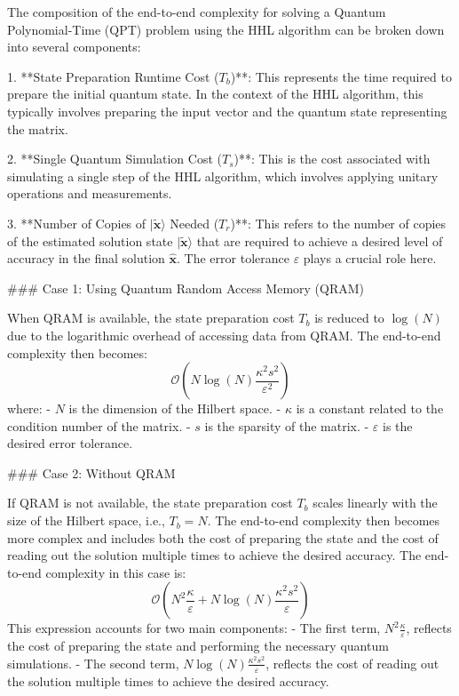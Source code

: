 The composition of the end-to-end complexity for solving a Quantum Polynomial-Time (QPT) problem using the HHL algorithm can be broken down into several components:

1. **State Preparation Runtime Cost ($T_b$)**: This represents the time required to prepare the initial quantum state. In the context of the HHL algorithm, this typically involves preparing the input vector and the quantum state representing the matrix.

2. **Single Quantum Simulation Cost ($T_s$)**: This is the cost associated with simulating a single step of the HHL algorithm, which involves applying unitary operations and measurements.

3. **Number of Copies of $|\widetilde{\mathbf{x}}\rangle$ Needed ($T_r$)**: This refers to the number of copies of the estimated solution state $|\widetilde{\mathbf{x}}\rangle$ that are required to achieve a desired level of accuracy in the final solution $\widehat{\mathbf{x}}$. The error tolerance $\varepsilon$ plays a crucial role here.

### Case 1: Using Quantum Random Access Memory (QRAM)

When QRAM is available, the state preparation cost $T_b$ is reduced to $\log(N)$ due to the logarithmic overhead of accessing data from QRAM. The end-to-end complexity then becomes:
\[
\mathcal{O}\left( N \log(N) \frac{\kappa^2 s^2}{\varepsilon^2} \right)
\]
where:
- \( N \) is the dimension of the Hilbert space.
- \( \kappa \) is a constant related to the condition number of the matrix.
- \( s \) is the sparsity of the matrix.
- \( \varepsilon \) is the desired error tolerance.

### Case 2: Without QRAM

If QRAM is not available, the state preparation cost $T_b$ scales linearly with the size of the Hilbert space, i.e., \( T_b = N \). The end-to-end complexity then becomes more complex and includes both the cost of preparing the state and the cost of reading out the solution multiple times to achieve the desired accuracy. The end-to-end complexity in this case is:
\[
\mathcal{O}\left( N^2 \frac{\kappa}{\varepsilon} + N \log(N) \frac{\kappa^2 s^2}{\varepsilon} \right)
\]
This expression accounts for two main components:
- The first term, \( N^2 \frac{\kappa}{\varepsilon} \), reflects the cost of preparing the state and performing the necessary quantum simulations.
- The second term, \( N \log(N) \frac{\kappa^2 s^2}{\varepsilon} \), reflects the cost of reading out the solution multiple times to achieve the desired accuracy.

